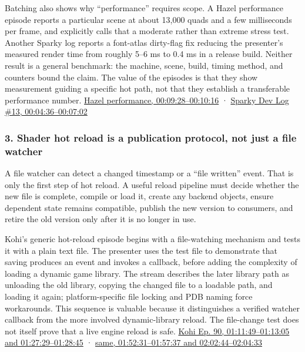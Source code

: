 Batching also shows why ``performance'' requires scope. A Hazel performance episode reports a particular scene at about 13,000 quads and a few milliseconds per frame, and explicitly calls that a moderate rather than extreme stress test. Another Sparky log reports a font-atlas dirty-flag fix reducing the presenter's measured render time from roughly 5--6 ms to 0.4 ms in a release build. Neither result is a general benchmark: the machine, scene, build, timing method, and counters bound the claim. The value of the episodes is that they show measurement guiding a specific hot path, not that they establish a transferable performance number. \href{https://www.youtube.com/watch?v=Yw7RpvmqvSE&t=9m28s}{Hazel performance, 00:09:28--00:10:16} · \href{https://www.youtube.com/watch?v=njTgcayfhJU&t=4m36s}{Sparky Dev Log \#13, 00:04:36--00:07:02}

\subsubsection{3. Shader hot reload is a publication protocol, not just a file watcher}\label{shader-hot-reload-is-a-publication-protocol-not-just-a-file-watcher}

A file watcher can detect a changed timestamp or a ``file written'' event. That is only the first step of hot reload. A useful reload pipeline must decide whether the new file is complete, compile or load it, create any backend objects, ensure dependent state remains compatible, publish the new version to consumers, and retire the old version only after it is no longer in use.

Kohi's generic hot-reload episode begins with a file-watching mechanism and tests it with a plain text file. The presenter uses the test file to demonstrate that saving produces an event and invokes a callback, before adding the complexity of loading a dynamic game library. The stream describes the later library path as unloading the old library, copying the changed file to a loadable path, and loading it again; platform-specific file locking and PDB naming force workarounds. This sequence is valuable because it distinguishes a verified watcher callback from the more involved dynamic-library reload. The file-change test does not itself prove that a live engine reload is safe. \href{https://www.youtube.com/watch?v=SBG-qrT8wmg&t=1h11m49s}{Kohi Ep. 90, 01:11:49--01:13:05 and 01:27:29--01:28:45} · \href{https://www.youtube.com/watch?v=SBG-qrT8wmg&t=1h52m31s}{same, 01:52:31--01:57:37 and 02:02:44--02:04:33}

